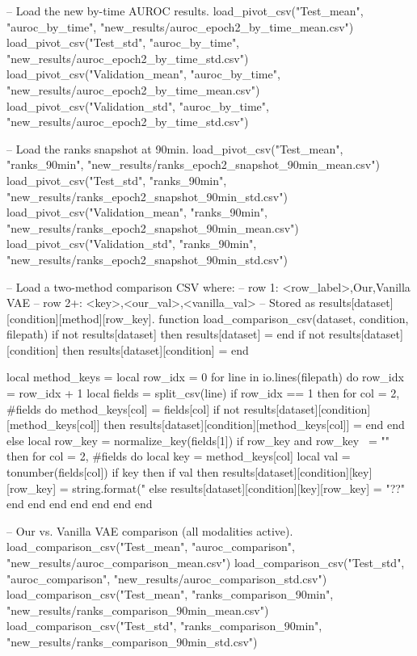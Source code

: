\begin{luacode*}
      -- Load the new by-time AUROC results.
      load_pivot_csv("Test_mean", "auroc_by_time", "new_results/auroc_epoch2_by_time_mean.csv")
      load_pivot_csv("Test_std", "auroc_by_time", "new_results/auroc_epoch2_by_time_std.csv")
      load_pivot_csv("Validation_mean", "auroc_by_time", "new_results/auroc_epoch2_by_time_mean.csv")
      load_pivot_csv("Validation_std", "auroc_by_time", "new_results/auroc_epoch2_by_time_std.csv")

      -- Load the ranks snapshot at 90min.
      load_pivot_csv("Test_mean", "ranks_90min", "new_results/ranks_epoch2_snapshot_90min_mean.csv")
      load_pivot_csv("Test_std", "ranks_90min", "new_results/ranks_epoch2_snapshot_90min_std.csv")
      load_pivot_csv("Validation_mean", "ranks_90min", "new_results/ranks_epoch2_snapshot_90min_mean.csv")
      load_pivot_csv("Validation_std", "ranks_90min", "new_results/ranks_epoch2_snapshot_90min_std.csv")

      -- Load a two-method comparison CSV where:
      -- row 1: <row_label>,Our,Vanilla VAE
      -- row 2+: <key>,<our_val>,<vanilla_val>
      -- Stored as results[dataset][condition][method][row_key].
      function load_comparison_csv(dataset, condition, filepath)
      if not results[dataset] then results[dataset] = {} end
      if not results[dataset][condition] then results[dataset][condition] = {} end

      local method_keys = {}
      local row_idx = 0
      for line in io.lines(filepath) do
      row_idx = row_idx + 1
      local fields = split_csv(line)
      if row_idx == 1 then
      for col = 2, #fields do
      method_keys[col] = fields[col]
      if not results[dataset][condition][method_keys[col]] then
      results[dataset][condition][method_keys[col]] = {}
      end
      end
      else
      local row_key = normalize_key(fields[1])
      if row_key and row_key ~= "" then
      for col = 2, #fields do
      local key = method_keys[col]
      local val = tonumber(fields[col])
      if key then
      if val then
      results[dataset][condition][key][row_key] = string.format("%
        else
        results[dataset][condition][key][row_key] = "??"
        end
        end
        end
        end
        end
        end
        end

        -- Our vs. Vanilla VAE comparison (all modalities active).
        load_comparison_csv("Test_mean", "auroc_comparison", "new_results/auroc_comparison_mean.csv")
        load_comparison_csv("Test_std", "auroc_comparison", "new_results/auroc_comparison_std.csv")
        load_comparison_csv("Test_mean", "ranks_comparison_90min", "new_results/ranks_comparison_90min_mean.csv")
        load_comparison_csv("Test_std", "ranks_comparison_90min", "new_results/ranks_comparison_90min_std.csv")


\end{luacode*}
